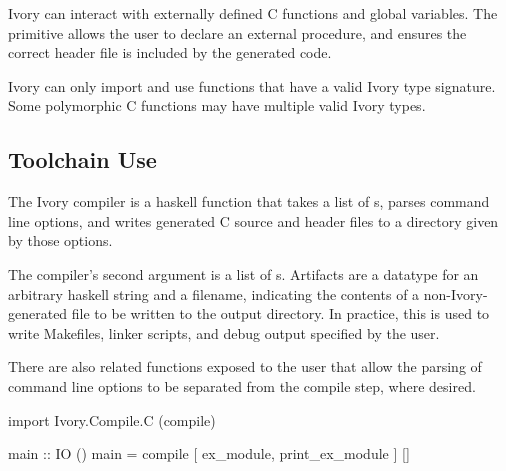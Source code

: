 Ivory can interact with externally defined C functions and global
variables. The  primitive allows the user to declare an external
procedure, and ensures the correct header file is included by the generated
code.

Ivory can only import and use functions that have a valid Ivory type signature.
Some polymorphic C functions may have multiple valid Ivory types.

\subsection{Toolchain Use}
The Ivory compiler is a haskell function that takes a list of s,
parses command line options, and writes generated C source and header files to
a directory given by those options.

The compiler's second argument is a list of s. Artifacts are a
datatype for an arbitrary haskell string and a filename, indicating the contents
of a non-Ivory-generated file to be written to the output directory. In
practice, this is used to write Makefiles, linker scripts, and debug output
specified by the user.

There are also related functions exposed to the user that allow the parsing
of command line options to be separated from the compile step, where desired.

\begin{code}
import Ivory.Compile.C (compile)

main :: IO ()
main = compile [ ex_module, print_ex_module ] []
\end{code}






